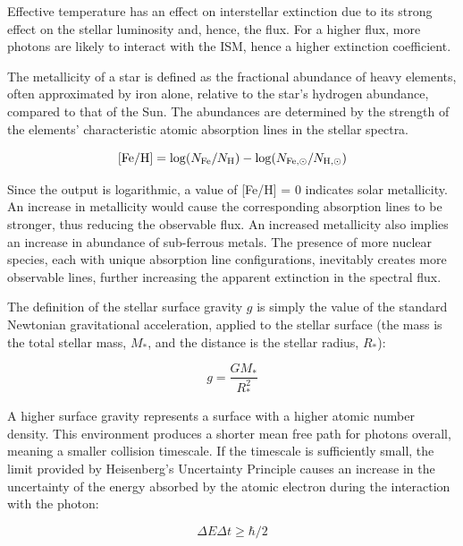 \documentclass[12pt, a4paper]{report}
\begin{document}
Effective temperature has an effect on interstellar extinction due to its strong effect on the stellar luminosity and, hence, the flux. For a higher flux, more photons are likely to interact with the ISM, hence a higher extinction coefficient.

The metallicity of a star is defined as the fractional abundance of heavy elements, often approximated by iron alone, relative to the star's hydrogen abundance, compared to that of the Sun. The abundances are determined by the strength of the elements' characteristic atomic absorption lines in the stellar spectra.

\begin{equation}
\textnormal{[Fe/H]} = \log(N_{\textnormal{Fe}}/N_{\textnormal{H}}) - \log(N_{\textnormal{Fe},\odot}/N_{\textnormal{H},\odot})
\label{FeH_def}
\end{equation}

Since the output is logarithmic, a value of [Fe/H] = 0 indicates solar metallicity. An increase in metallicity would cause the corresponding absorption lines to be stronger, thus reducing the observable flux. An increased metallicity also implies an increase in abundance of sub-ferrous metals. The presence of more nuclear species, each with unique absorption line configurations, inevitably creates more observable lines, further increasing the apparent extinction in the spectral flux.

The definition of the stellar surface gravity $g$ is simply the value of the standard Newtonian gravitational acceleration, applied to the stellar surface (the mass is the total stellar mass, $M_{*}$, and the distance is the stellar radius, $R_{*}$):

\begin{equation}
g = \frac{GM_{*}}{R_{*}^{2}}
\label{gravity_def}
\end{equation}

A higher surface gravity represents a surface with a higher atomic number density. This environment produces a shorter mean free path for photons overall, meaning a smaller collision timescale. If the timescale is sufficiently small, the limit provided by Heisenberg's Uncertainty Principle causes an increase in the uncertainty of the energy absorbed by the atomic electron during the interaction with the photon:

\begin{equation}
\Delta E \Delta t \geq \hbar/2
\label{heisenberg}
\end{equation}
\end{document}
